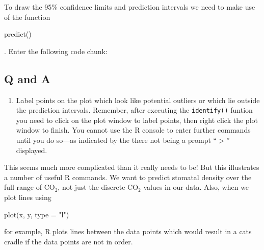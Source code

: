 \documentclass[letterpaper,10pt]{article}
\newenvironment{rline}{\begin{small}\begin{ttfamily}}{\end{ttfamily}\end{small}}
\begin{document}
To draw the 95\% confidence limits and prediction intervals we need to make use of the function \begin{rline}predict()\end{rline}. Enter the following code chunk:


\begin{Schunk}
\end{Schunk}

\subsection*{Q and A}
\begin{enumerate}
\item Label points on the plot which look like potential outliers or which lie outside the prediction intervals. Remember, after executing the \texttt{identify()} funtion you need to click on the plot window to label points, then right click the plot window to finish. You cannot use the R console to enter further commands until you do so---as indicated by the there not being a prompt ``$>$'' displayed.
\end{enumerate}

This seems much more complicated than it really needs to be! But this illustrates a number of useful R commands. We want to predict stomatal density over the full range of $_2$, not just the discrete $_2$ values in our data. Also, when we plot lines using \begin{rline}plot(x, y, type = "l")\end{rline} for example, R plots lines between the data points which would result in a cats cradle if the data points are not in order.
\end{document}

